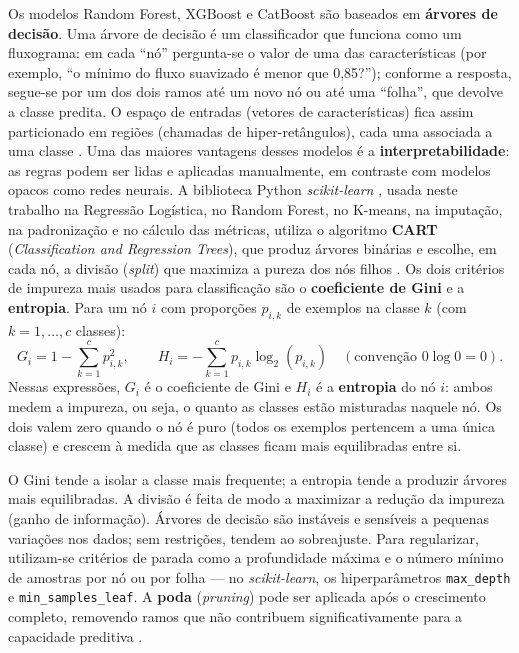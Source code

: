 Os modelos Random Forest, XGBoost e CatBoost são baseados em \textbf{árvores de decisão}. Uma árvore de decisão é um classificador que funciona como um fluxograma: em cada ``nó'' pergunta-se o valor de uma das características (por exemplo, ``o mínimo do fluxo suavizado é menor que 0,85?''); conforme a resposta, segue-se por um dos dois ramos até um novo nó ou até uma ``folha'', que devolve a classe predita. O espaço de entradas (vetores de características) fica assim particionado em regiões (chamadas de hiper-retângulos), cada uma associada a uma classe \citep{Levada2026}. Uma das maiores vantagens desses modelos é a \textbf{interpretabilidade}: as regras podem ser lidas e aplicadas manualmente, em contraste com modelos opacos como redes neurais. A biblioteca Python \textit{scikit-learn} \citep{ScikitLearn2011}, usada neste trabalho na Regressão Logística, no Random Forest, no K-means, na imputação, na padronização e no cálculo das métricas, utiliza o algoritmo \textbf{CART} (\textit{Classification and Regression Trees}), que produz árvores binárias e escolhe, em cada nó, a divisão (\textit{split}) que maximiza a pureza dos nós filhos \citep{geron2019maos}. Os dois critérios de impureza mais usados para classificação são o \textbf{coeficiente de Gini} e a \textbf{entropia}. Para um nó \(i\) com proporções \(p_{i,k}\) de exemplos na classe \(k\) (com \(k=1,\ldots,c\) classes):
\begin{equation}
G_i = 1 - \sum_{k=1}^{c} p_{i,k}^2, \qquad
H_i = -\sum_{k=1}^{c} p_{i,k} \log_2(p_{i,k}) \quad (\text{convenção } 0\log 0 = 0).
\end{equation}
Nessas expressões, \(G_i\) é o coeficiente de Gini e \(H_i\) é a \textbf{entropia} do nó \(i\): ambos medem a impureza, ou seja, o quanto as classes estão misturadas naquele nó. Os dois valem zero quando o nó é puro (todos os exemplos pertencem a uma única classe) e crescem à medida que as classes ficam mais equilibradas entre si.

O Gini tende a isolar a classe mais frequente; a entropia tende a produzir árvores mais equilibradas. A divisão é feita de modo a maximizar a redução da impureza (ganho de informação). Árvores de decisão são instáveis e sensíveis a pequenas variações nos dados; sem restrições, tendem ao sobreajuste. Para regularizar, utilizam-se critérios de parada como a profundidade máxima e o número mínimo de amostras por nó ou por folha \citep{geron2019maos} --- no \textit{scikit-learn}, os hiperparâmetros \texttt{max\_depth} e \texttt{min\_samples\_leaf}. A \textbf{poda} (\textit{pruning}) pode ser aplicada após o crescimento completo, removendo ramos que não contribuem significativamente para a capacidade preditiva \citep{Levada2026}.

